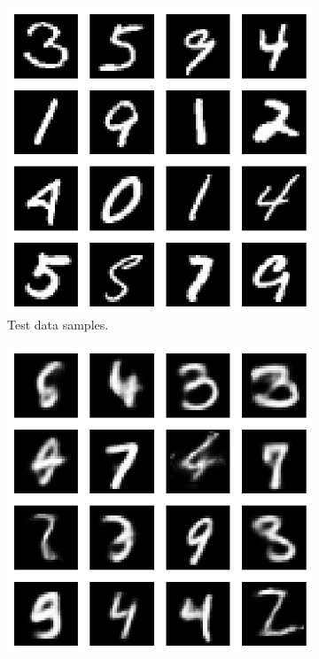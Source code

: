 \begin{figure}[t!]
    \begin{subfigure}[t]{0.32\linewidth}
        \centering
        \includegraphics[width=0.9\linewidth]{figures/ivae/mnist/mnist-data-samples.png}
        \caption{Test data samples.}
        \label{fig:mnist_data_samples}
    \end{subfigure}
    \hfill
    \begin{subfigure}[t]{0.32\linewidth}
        \centering
        \includegraphics[width=0.9\linewidth]{figures/ivae/mnist/mnist-ivae-samples.png}

\end{subfigure}
\end{figure}
